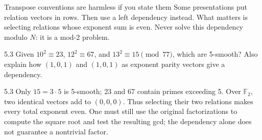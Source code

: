 \documentclass[11pt,a4paper]{article}
\newcommand{\F}{\mathbb F}\newcommand{\Z}{\mathbb Z}
\begin{document}
\begin{tip}{Transpose conventions are harmless if you state them}
Some presentations put relation vectors in rows. Then use a left dependency instead. What matters is selecting relations whose exponent sum is even. Never solve this dependency modulo \(N\): it is a mod-2 problem.
\end{tip}
\begin{question}{5.3}
Given \(10^2\equiv23\), \(12^2\equiv67\), and \(13^2\equiv15\pmod{77}\), which are 5-smooth? Also explain how \((1,0,1)\) and \((1,0,1)\) as exponent parity vectors give a dependency.
\end{question}
\begin{answer}{5.3}
Only \(15=3\cdot5\) is 5-smooth; 23 and 67 contain primes exceeding 5. Over \(\F_2\), two identical vectors add to \((0,0,0)\). Thus selecting their two relations makes every total exponent even. One must still use the original factorizations to compute the square root and test the resulting gcd; the dependency alone does not guarantee a nontrivial factor.
\end{answer}
\end{document}
